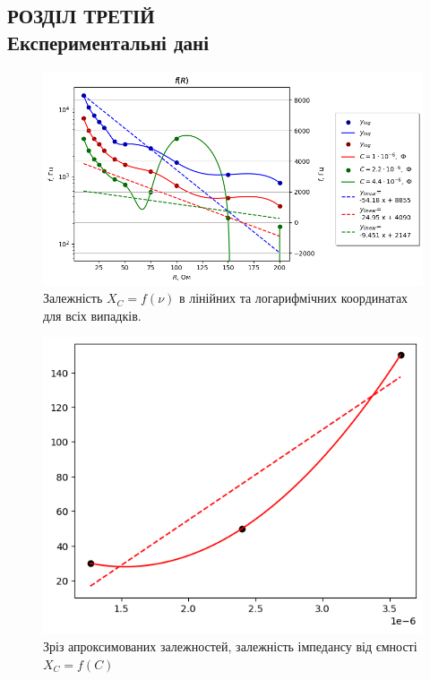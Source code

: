 \documentclass[a4paper,12pt]{article}
\begin{document}
\newpage
	\begin{center}
		\section* {РОЗДІЛ ТРЕТІЙ\\Експериментальні дані}
	\end{center}

    \begin{figure}[h!]
		\centering
		\begin{minipage}[h]{1\linewidth}
			\includegraphics[width=1\linewidth]{Prt sc/Figure_1.png}
			\caption{Залежність $X_C=f(\nu)$  в лінійних та логарифмічних координатах для всіх випадків.}
			\label{Figure_1}
		\end{minipage}
	\end{figure}

    \begin{figure}[h!]
		\centering
		\begin{minipage}[h]{1\linewidth}
			\includegraphics[width=0.8\linewidth]{Prt sc/Figure_2.png}
			\caption{Зріз апроксимованих залежностей, залежність імпедансу від ємності $X_C=f(C)$}
			\label{Figure_2}
		\end{minipage}
	\end{figure}
\end{document}
